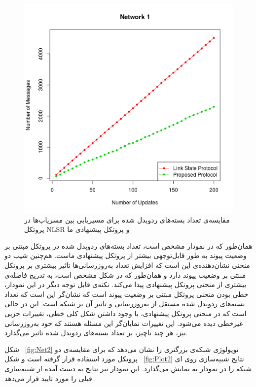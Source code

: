 \begin{figure}[h!]
\centering
\includegraphics[scale=0.8]{./resources/figures/Test1.png}
\caption{مقایسه‌ی تعداد بسته‌های ردوبدل شده برای مسیریابی بین مسریاب‌ها در پروتکل NLSR و پروتکل پیشنهادی ما}
\label{fig:Plot1}
\end{figure}همان‌طور که در نمودار مشخص است، تعداد بسته‌های ردوبدل شده در پروتکل مبتنی بر وضعیت پیوند به طور قابل‌توجهی بیشتر از پروتکل پیشنهادی ماست. هم‌چنین شیب دو منحنی نشان‌دهنده‌ی این است که افزایش تعداد به‌روزرسانی‌ها تاثیر بیشتری بر پروتکل مبنتی بر وضعیت پیوند دارد و همان‌طور که در شکل مشخص است، به تدریج فاصله‌ی بیشتری از منحنی پروتکل پیشنهادی پیدا می‌کند. نکته‌ی قابل توجه دیگر در این نمودار، خطی بودن منحنی پروتکل مبتنی بر وضعیت پیوند است که نشان‌گر این است که تعداد بسته‌های ردو‌بدل شده مستقل از به‌روزرسانی و تاثیر آن بر شبکه است. این در حالی است که در منحنی پروتکل پیشنهادی، با وجود داشتن شکل کلی خطی، تغییرات جزیی غیرخطی دیده می‌شود. این تغییرات نمایان‌گر این مسئله هستند که خود به‌روزرسانی نیز، هر چند ناچیز، بر تعداد بسته‌های ردوبدل شده تاثیر می‌گذارد. 

شکل ~\ref{fig:Net2} توپولوژی شبکه‌ی بزرگتری را نشان می‌دهد که برای مقایسه‌ی دو پروتکل مورد استفاده قرار گرفته است و شکل ~\ref{fig:Plot2} نتایج شبیه‌سازی روی ای شبکه را در نمودار به نمایش می‌گذارد. این نمودار نیز نتایج به دست آمده از شبیه‌سازی قبلی را مورد تایید قرار می‌دهد.

